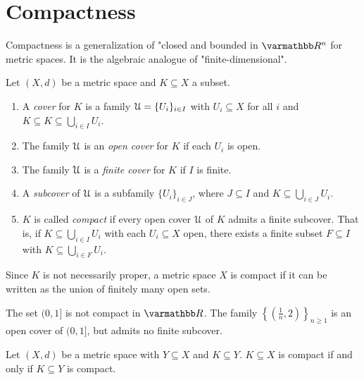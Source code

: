 \section{Compactness}\label{sec:compactness}
    Compactness is a generalization of "closed and bounded in $\bfR^n$ for metric spaces. It is the algebraic analogue of "finite-dimensional".

    \begin{definition}
        Let $(X,d)$ be a metric space and $K \subseteq X$ a subset.
        \begin{enumerate}[label = (\arabic*),itemsep=1pt,topsep=3pt]
            \item A \textit{cover} for $K$ is a family $\mathcal{U} = \{U_i\}_{i \in I}$ with $U_i \subseteq X$ for all $i$ and $K \subseteq K \subseteq \bigcup_{i \in I}U_i$.
            \item The family $\mathcal{U}$ is an \textit{open cover} for $K$ if each $U_i$ is open.
            \item The family $\mathcal{U}$ is a \textit{finite cover} for $K$ if $I$ is finite.
            \item A \textit{subcover} of $\mathcal{U}$ is a subfamily $\{U_i\}_{i \in J}$, where $J \subseteq I$ and $K \subseteq \bigcup_{i \in J}U_i$.
            \item $K$ is called \textit{compact} if every open cover $\mathcal{U}$ of $K$ admits a finite subcover. That is, if $K \subseteq \bigcup_{i \in I}U_i$ with each $U_i \subseteq X$ open, there exists a finite subset $F \subseteq I$ with $K \subseteq \bigcup_{i \in F}U_i$.
        \end{enumerate}
    \end{definition}

    Since $K$ is not necessarily proper, a metric space $X$ is compact if it can be written as the union of finitely many open sets.

    \begin{example}
        The set $(0,1]$ is not compact in $\bfR$. The family $\left\{\left(\frac{1}{n},2\right)\right\}_{n \geq 1}$ is an open cover of $(0,1]$, but admits no finite subcover.
    \end{example}

    \begin{exercise}
        Let $(X,d)$ be a metric space with $Y \subseteq X$ and $K \subseteq Y$. $K \subseteq X$ is compact if and only if $K \subseteq Y$ is compact.
    \end{exercise}

